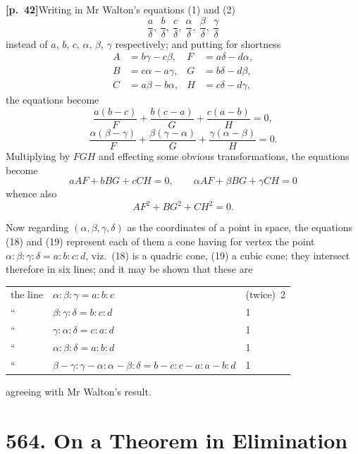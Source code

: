 \documentclass[11pt,a4paper]{article}
\begin{document}
\bigskip

\noindent\textbf{[p.~42]}\quad Writing in Mr Walton's equations (1) and (2)
\[
\frac{a}{\delta},\ \frac{b}{\delta},\ \frac{c}{\delta},\ \frac{\alpha}{\delta},\ \frac{\beta}{\delta},\ \frac{\gamma}{\delta}
\]
instead of $a$, $b$, $c$, $\alpha$, $\beta$, $\gamma$ respectively; and putting for shortness
\begin{align*}
A &= b\gamma - c\beta, & F &= a\delta - d\alpha, \\
B &= c\alpha - a\gamma, & G &= b\delta - d\beta, \\
C &= a\beta - b\alpha, & H &= c\delta - d\gamma,
\end{align*}
the equations become
\[
\frac{a(b-c)}{F} + \frac{b(c-a)}{G} + \frac{c(a-b)}{H} = 0,
\]
\[
\frac{\alpha(\beta-\gamma)}{F} + \frac{\beta(\gamma-\alpha)}{G} + \frac{\gamma(\alpha-\beta)}{H} = 0.
\]
Multiplying by $FGH$ and effecting some obvious transformations, the equations become
\[
aAF + bBG + cCH = 0,\qquad \alpha AF + \beta BG + \gamma CH = 0 \tag{18}
\]
whence also
\[
AF^{2} + BG^{2} + CH^{2} = 0. \tag{19}
\]

Now regarding $(\alpha, \beta, \gamma, \delta)$ as the coordinates of a point in space, the equations (18) and (19) represent each of them a cone having for vertex the point $\alpha:\beta:\gamma:\delta = a:b:c:d$, viz.\ (18) is a quadric cone, (19) a cubic cone; they intersect therefore in six lines; and it may be shown that these are
\begin{center}
\begin{tabular}{lll}
the line & $\alpha:\beta:\gamma = a:b:c$ & (twice)\ 2 \\
``\quad     & $\beta:\gamma:\delta = b:c:d$ & 1 \\
``\quad     & $\gamma:\alpha:\delta = c:a:d$ & 1 \\
``\quad     & $\alpha:\beta:\delta = a:b:d$ & 1 \\
``\quad     & $\beta-\gamma:\gamma-\alpha:\alpha-\beta:\delta = b-c:c-a:a-b:d$ & 1
\end{tabular}
\end{center}
agreeing with Mr Walton's result.

\bigskip

\section*{\textbf{564.} On a Theorem in Elimination}
\end{document}

